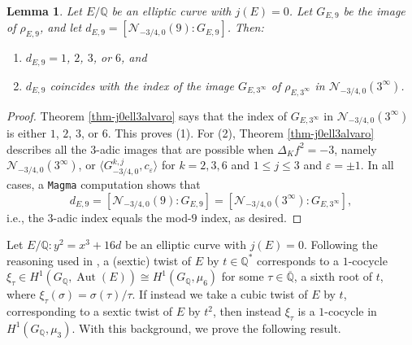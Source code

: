\documentclass[11pt]{amsart}
\newtheorem{lemma}[defn]{Lemma}
\theoremstyle{definition}
\newcommand{\Q}{\mathbb Q}
\newcommand{\Aut}{\operatorname{Aut}}
\begin{document}
\begin{lemma}\label{lem-j0index}
    Let $E/\Q$ be an elliptic curve with $j(E)=0$. Let $G_{E,9}$ be the image of $\rho_{E,9}$, and let $d_{E,9}=[\mathcal{N}_{-3/4,0}(9):G_{E,9}]$. Then:
    \begin{enumerate}
        \item $d_{E,9}=1$, $2$, $3$, or $6$, and
        \item $d_{E,9}$ coincides with the index of the image $G_{E,3^\infty}$ of $\rho_{E,3^\infty}$ in $\mathcal{N}_{-3/4,0}(3^{\infty})$.
    \end{enumerate}
\end{lemma}
\begin{proof}


      Theorem \ref{thm-j0ell3alvaro} says that the index of $G_{E, 3^{\infty}}$ in $\mathcal{N}_{-3/4,0}(3^{\infty})$ is either $1$, $2$, $3$, or $6$. This proves (1). For (2), Theorem \ref{thm-j0ell3alvaro} describes all the $3$-adic images that are possible when $\Delta_K f^2=-3$, namely $\mathcal{N}_{-3/4,0}(3^{\infty})$, or $\langle G_{-3/4,0}^{k,j},c_\varepsilon \rangle$ for $k=2,3,6$ and $1\leq j \leq 3$ and $\varepsilon=\pm 1$. In all cases, a \verb|Magma| computation shows that 
    $$d_{E,9}=[\mathcal{N}_{-3/4,0}(9):G_{E,9}]=[\mathcal{N}_{-3/4,0}(3^\infty):G_{E,3^\infty}],$$ i.e., the $3$-adic index equals the mod-$9$ index, as desired.
\end{proof}

Let $E/\Q : y^2 = x^3 + 16d$ be an elliptic curve with $j(E) = 0$. Following the reasoning used in \cite[Cor. X.5.4.1]{silverman1}, a (sextic) twist of $E$ by $t \in \Q^{\ast}$ corresponds to a $1$-cocycle $\xi_\tau \in H^1(G_{\Q}, \Aut(E)) \cong H^1(G_{\Q}, \mu_6)$ for some $\tau \in \overline{\Q}$, a sixth root of $t$, where $\xi_\tau(\sigma) = \sigma(\tau)/\tau$. If instead we take a cubic twist of $E$ by $t$, corresponding to a sextic twist of $E$ by $t^2$, then instead $\xi_\tau$ is a $1$-cocycle in $H^1(G_{\Q}, \mu_3)$. With this background, we prove the following result.
\end{document}
